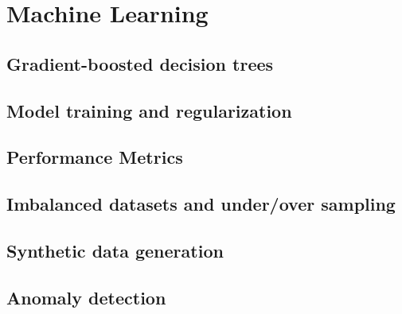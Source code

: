 \chapter{Machine Learning}
\section{Gradient-boosted decision trees}
\section{Model training and regularization}
\section{Performance Metrics}
\section{Imbalanced datasets and under/over sampling}
\section{Synthetic data generation}
\section{Anomaly detection}

